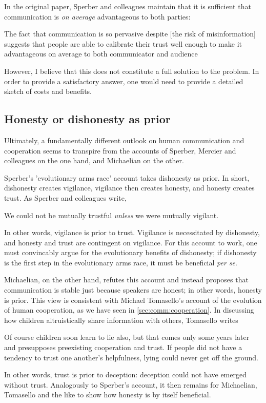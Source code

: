 In the original \citeyear{Sperber10} paper, Sperber and colleagues maintain that it is sufficient that communication is \emph{on average} advantageous to both parties:
\begin{quoting}
    The fact that communication is so pervasive despite [the risk of misinformation] suggests that people are able to calibrate their trust well enough to make it advantageous on average to both communicator and audience
    \hfill \citep[p.~360]{Sperber10}
\end{quoting}
However, I believe that this does not constitute a full solution to the problem. 
In order to provide a satisfactory answer, one would need to provide a detailed sketch of costs and benefits.

\subsection{Honesty or dishonesty as prior}


Ultimately, a fundamentally different outlook on human communication and cooperation seems to transpire from the accounts of Sperber, Mercier and colleagues on the one hand, and Michaelian on the other.

Sperber's 'evolutionary arms race' account takes dishonesty as prior.
In short, dishonesty creates vigilance, vigilance then creates honesty, and honesty creates trust. As Sperber and colleagues write,
\begin{quoting}
    We could not be mutually trustful \emph{unless} we were mutually vigilant.
    \hfill \citep[p.~364]{Sperber10}
\end{quoting}
In other words, vigilance is prior to trust. Vigilance is necessitated by dishonesty, and honesty and trust are contingent on vigilance.
For this account to work, one must convincably argue for the evolutionary benefits of dishonesty; if dishonesty is the first step in the evolutionary arms race, it must be beneficial \emph{per se}.

Michaelian, on the other hand, refutes this account and instead proposes that communication is stable just because speakers are honest; in other words, honesty is prior. This view is consistent with Michael Tomasello's account of the evolution of human cooperation, as we have seen in \cref{sec:comm:cooperation}. In discussing how children altruistically share information with others, Tomasello writes
\begin{quoting}
    Of course children soon learn to lie also, but that comes only some years later and presupposes preexisting cooperation and trust. If people did not have a tendency to trust one another’s helpfulness, lying could never get off the ground.
    \hfill \citep[p.~21]{Tomasello09}
\end{quoting}
In other words, trust is prior to deception: deception could not have emerged without trust.
Analogously to Sperber's account, it then remains for Michaelian, Tomasello and the like to show how honesty is by itself beneficial.

